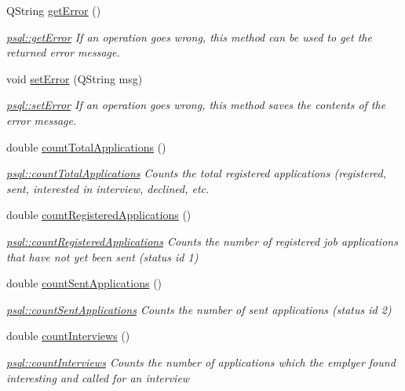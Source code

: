 \begin{DoxyCompactItemize}
Q\+String \hyperlink{classpsql_a5f51e254b67ff932f287df2184ccc043}{get\+Error} ()
\begin{DoxyCompactList}\small\item\em \hyperlink{classpsql_a5f51e254b67ff932f287df2184ccc043}{psql\+::get\+Error} If an operation goes wrong, this method can be used to get the returned error message. \end{DoxyCompactList}\item 
void \hyperlink{classpsql_a9a0d5ba32aabe6018a36fb0bc185445b}{set\+Error} (Q\+String msg)
\begin{DoxyCompactList}\small\item\em \hyperlink{classpsql_a9a0d5ba32aabe6018a36fb0bc185445b}{psql\+::set\+Error} If an operation goes wrong, this method saves the contents of the error message. \end{DoxyCompactList}\item 
double \hyperlink{classpsql_a496d0a426a1539bf9babd1dd4e9fcd96}{count\+Total\+Applications} ()
\begin{DoxyCompactList}\small\item\em \hyperlink{classpsql_a496d0a426a1539bf9babd1dd4e9fcd96}{psql\+::count\+Total\+Applications} Counts the total registered applications (registered, sent, interested in interview, declined, etc. \end{DoxyCompactList}\item 
double \hyperlink{classpsql_a8673a80968d293cd3ead6e6e9da8dd8a}{count\+Registered\+Applications} ()
\begin{DoxyCompactList}\small\item\em \hyperlink{classpsql_a8673a80968d293cd3ead6e6e9da8dd8a}{psql\+::count\+Registered\+Applications} Counts the number of registered job applications that have not yet been sent (status id 1) \end{DoxyCompactList}\item 
double \hyperlink{classpsql_af5e6768f6c51ac7b94571505f7a628e4}{count\+Sent\+Applications} ()
\begin{DoxyCompactList}\small\item\em \hyperlink{classpsql_af5e6768f6c51ac7b94571505f7a628e4}{psql\+::count\+Sent\+Applications} Counts the number of sent applications (status id 2) \end{DoxyCompactList}\item 
double \hyperlink{classpsql_a84c1fdea2d09783a39677c4f79d924fc}{count\+Interviews} ()
\begin{DoxyCompactList}\small\item\em \hyperlink{classpsql_a84c1fdea2d09783a39677c4f79d924fc}{psql\+::count\+Interviews} Counts the number of applications which the emplyer found interesting and called for an interview \end{DoxyCompactList}\item 

\end{DoxyCompactItemize}
